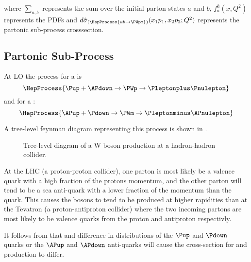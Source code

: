where $\sum\limits_{a,b}$ represents the sum over the initial parton states $a$
and $b$, $f_a^{h}(x,Q^2)$ represents the \acp{PDF} and
$d\hat{\sigma}_{(\HepProcess{a b \to \PWpm})}(x_1 p_1, x_2 p_2; Q^2)$
represents the partonic sub-process crosssection.

\subsection{Partonic Sub-Process}

At \ac{LO} the process for a \PWp is
\begin{equation}
  \HepProcess{\Pup + \APdown \to \PWp \to \Pleptonplus \Pnulepton} \label{wbos:wprod} \\
\end{equation}
and for a \PWm:
\begin{equation}
  \HepProcess{\APup + \Pdown \to \PWm \to \Pleptonminus \APnulepton}
\end{equation}

A tree-level feynman diagram representing this process is shown in
.

\begin{figure}[htb]
  \centering
  \caption{Tree-level diagram of a W boson production at a hadron-hadron collider.}
  \label{wbos:feynman}
\end{figure}


At the \ac{LHC} (a proton-proton collider), one parton is most likely be a
valence quark with a high fraction of the protons momentum, and the other
parton will tend to be a sea anti-quark with a lower fraction of the momentum
than the quark. This causes the \PW bosons to tend to be produced at higher
rapidities than at the Tevatron (a proton-antiproton collider) where the two
incoming partons are most likely to be valence quarks from the proton and
antiproton respectivly.

It follows from  that and difference in distributions of
the $\Pup$ and $\Pdown$ quarks or the $\APup$ and $\APdown$ anti-quarks will
cause the cross-section for \PWp and \PWm production to differ.

